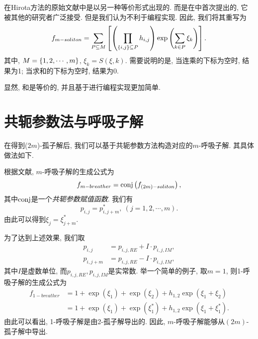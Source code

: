 在Hirota方法的原始文献\cite{hirota1971exact}中是以另一种等价形式出现的. 而是在中首次提出的, 它被其他的研究者广泛接受. 但是我们认为不利于编程实现. 因此, 我们将其重写为
\begin{equation}
    f_{m-soliton}=\sum_{P\subseteq M}\left[\left(\prod_{\left\{i,j\right\}\subseteq P}{h_{i,j}}\right)\exp\left(\sum_{k\in P}{\xi_k}\right)\right]. \label{f-soliton-new}
\end{equation}
其中, $M=\left\{1,2,\cdots,m\right\}$, $\xi_k=S(\xi,k)$. 需要说明的是, 当连乘的下标为空时, 结果为1; 当求和的下标为空时, 结果为0. 

显然, 和是等价的, 并且基于进行编程实现更加简单.

\section{共轭参数法与呼吸子解}
在得到($2m$)-孤子解后, 我们可以基于共轭参数方法构造对应的$m$-呼吸子解. 其具体做法如下.

根据文献\cite{tajiri1989breather}, $m$-呼吸子解的生成公式为
\begin{equation}
    f_{m-breather}={\rm conj}\left(f_{(2m)-soliton}\right), \label{f-breather}
\end{equation}
其中${\rm conj}$是一个\emph{共轭参数赋值函数}. 我们有 
\begin{equation}
    p_{i,j}=p_{i,j+m}^*,~(j=1,2,\cdots,m).
\end{equation}
由此可以得到$\xi_{j}=\xi_{j+m}^*$. 

为了达到上述效果, 我们取
\begin{equation}
\begin{split}
    p_{i,j}&=p_{i,j,RE}+I\cdot p_{i,j,IM}, \\ 
    p_{i,j+m}&=p_{i,j,RE}-I\cdot p_{i,j,IM},
\end{split}
\end{equation}
其中$I$是虚数单位, 而$p_{i,j,RE},p_{i,j,IM}$是实常数. 举一个简单的例子, 取$m=1$, 则1-呼吸子解的生成公式为
\begin{equation}
\begin{split}
f_{1-breather}&=1+\exp(\xi_1)+\exp(\xi_2)+h_{1,2}\exp(\xi_1+\xi_2) \\ 
&=1+\exp(\xi_1)+\exp(\xi_1^*)+h_{1,2}\exp(\xi_1+\xi_1^*).
\end{split}
\end{equation}
由此可以看出, 1-呼吸子解是由2-孤子解导出的. 因此, $m$-呼吸子解能够从$(2m)$-孤子解中导出.

